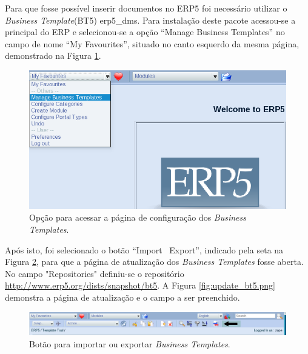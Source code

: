 Para que fosse possível inserir documentos no ERP5 foi necessário utilizar o \textit{Business Template}(BT5) erp5\_dms. Para instalação deste pacote acessou-se a principal do ERP e selecionou-se a opção ``Manage Business Templates'' no campo de nome ``My Favourites'', situado no canto esquerdo da mesma página, demonstrado na Figura \ref{fig:manage_bt5}.

\begin{figure}[!ht]
\centering
\begin{center}
\includegraphics[scale=0.430,bb=0 45 610 257]{manage_bt5.png}
\end{center}
\caption{Opção para acessar a página de configuração dos \textit{Business Templates}.}
\label{fig:manage_bt5}
\end{figure}

Após isto, foi selecionado o botão ``Import \ Export'', indicado pela seta na Figura \ref{fig:import_export.png}, para que a página de atualização dos \textit{Business Templates} fosse aberta. No campo "Repositories" definiu-se o repositório \url{http://www.erp5.org/dists/snapshot/bt5}. A Figura \ref{fig:update_bt5.png} demonstra a página de atualização e o campo a ser preenchido.

\begin{figure}[!ht]
\centering
\begin{center}
\includegraphics[scale=0.490,bb=0 30 1010 70]{import_export.png}
\end{center}
\caption{Botão para importar ou exportar \textit{Business Templates}.}
\label{fig:import_export.png}
\end{figure}

